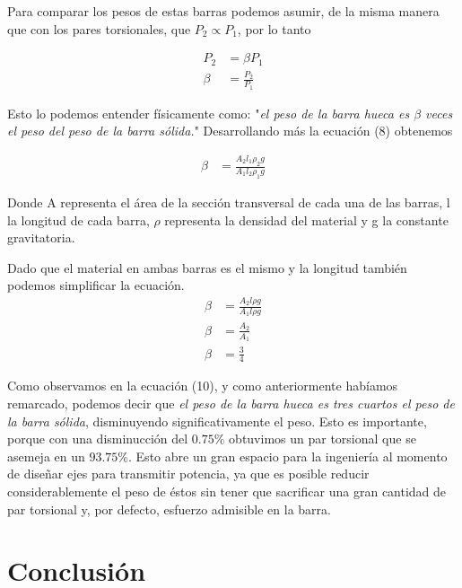 \documentclass[12pt, letterpaper]{article}
\begin{document}
Para comparar los pesos de estas barras podemos asumir, de la misma manera que con los pares torsionales, que $P_2 \propto P_1$, por lo tanto

\begin{equation}
	\begin{split}
		P_2 &= \beta P_1\\
		\beta &= \frac{P_2}{P_1}
	\end{split}
\end{equation}

Esto lo podemos entender físicamente como: "\textit{el peso de la barra hueca es $\beta$ veces el peso del peso de la barra sólida.}"
Desarrollando más la ecuación (8) obtenemos

\begin{equation}
	\begin{split}
		\beta &= \frac{A_2 l_1 \rho_2 g}{A_1 l_2 \rho_1 g}
	\end{split}
\end{equation}
\begin{center}
	Donde A representa el área de la sección transversal de cada una de las barras, l la longitud de cada barra, $\rho$ representa la densidad del material y g la constante gravitatoria. 
\end{center}
Dado que el material en ambas barras es el mismo y la longitud también podemos simplificar la ecuación.
\begin{equation}
	\begin{split}
		\beta &= \frac{A_2 l \rho g}{A_1 l \rho g}\\
		\beta &= \frac{A_2}{A_1}\\
		\beta &= \frac{3}{4}
	\end{split}
\end{equation}

Como observamos en la ecuación (10), y como anteriormente habíamos remarcado, podemos decir que \textit{el peso de la barra hueca es tres cuartos el peso de la barra sólida}, disminuyendo significativamente el peso. Esto es importante, porque con una disminucción del $0.75\%$ obtuvimos un par torsional que se asemeja en un $93.75\%$. Esto abre un gran espacio para la ingeniería al momento de diseñar ejes para transmitir potencia, ya que es posible reducir considerablemente el peso de éstos sin tener que sacrificar una gran cantidad de par torsional y, por defecto, esfuerzo admisible en la barra.

\section*{Conclusión}
\end{document}
